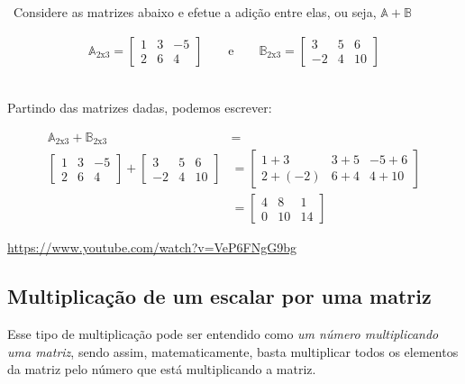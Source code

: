 \begin{example}
	\video \, Considere as matrizes abaixo e efetue a adição entre elas, ou seja, $\mathbb{A}+\mathbb{B}$
	
	\begin{ceqn}
		\begin{align*}
			\mathbb{A}_{2\mathrm{x}3}=\begin{bmatrix}1 & 3 & -5\\
		2 & 6 & 4
		\end{bmatrix}\qquad\mathrm{e}\qquad\mathbb{B}_{2\mathrm{x}3}=\begin{bmatrix}3 & 5 & 6\\
		-2 & 4 & 10
		\end{bmatrix}
		\end{align*}
	\end{ceqn}
\\

	Partindo das matrizes dadas, podemos escrever:


\begin{ceqn}
	\begin{align*}
		\mathbb{A}_{2\mathrm{x}3}+\mathbb{B}_{2\mathrm{x}3} & =\\
	\begin{bmatrix}1 & 3 & -5\\
	2 & 6 & 4
	\end{bmatrix}+\begin{bmatrix}3 & 5 & 6\\
	-2 & 4 & 10
	\end{bmatrix} & =  \begin{bmatrix}1+3 & 3+5 & -5+6\\
	2+(-2) & 6+4 & 4+10
	\end{bmatrix}\\
	& =  \begin{bmatrix}4 & 8 & 1\\
	0 & 10 & 14
	\end{bmatrix}
	\end{align*}
\end{ceqn}


\doutor \url{https://www.youtube.com/watch?v=VeP6FNgG9bg}
\end{example}

\subsection{Multiplicação de um escalar por uma matriz}

Esse tipo de multiplicação pode ser entendido como \textit{um número multiplicando uma matriz}, sendo assim, matematicamente, basta multiplicar todos os elementos da matriz pelo número que está multiplicando a matriz.

